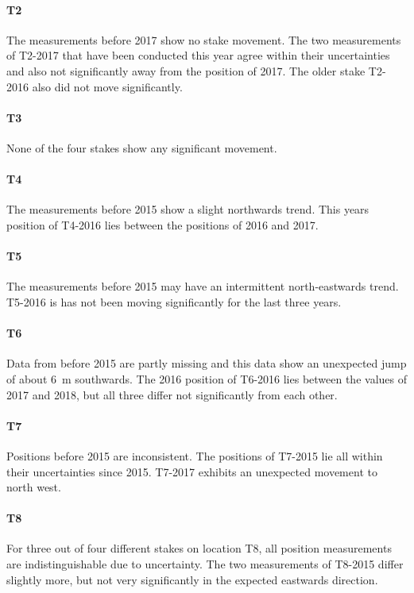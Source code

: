 \paragraph{T2}
The measurements before 2017 show no stake movement.
The two measurements of T2-2017 that have been conducted this year agree within their uncertainties and
also not significantly away from the position of 2017.
The older stake T2-2016 also did not move significantly.

\paragraph{T3}
None of the four stakes show any significant movement.

\paragraph{T4}
The measurements before 2015 show a slight northwards trend.
This years position of T4-2016 lies between the positions of 2016 and 2017.

\paragraph{T5}
The measurements before 2015 may have an intermittent north-eastwards trend.
T5-2016 is has not been moving significantly for the last three years.

\paragraph{T6}
Data from before 2015 are partly missing and this data show an unexpected jump of about 6~m southwards.
The 2016 position of T6-2016 lies between the values of 2017 and 2018,
but all three differ not significantly from each other.

\paragraph{T7}
Positions before 2015 are inconsistent.
The positions of T7-2015 lie all within their uncertainties since 2015.
T7-2017 exhibits an unexpected movement to north west.

\paragraph{T8}
For three out of four different stakes on location T8, all position measurements are indistinguishable due to uncertainty.
The two measurements of T8-2015 differ slightly more, but not very significantly in the expected eastwards direction.
\bigskip

